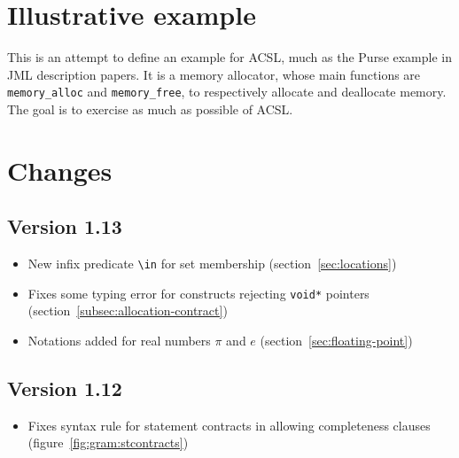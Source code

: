 \documentclass[web]{frama-c-book}
\begin{document}






\section{Illustrative example}
\label{sec:illustrative-example}
This is an attempt to define an example for ACSL, much as the Purse
example in JML description papers.  It is a memory allocator, whose
main functions are \lstinline|memory_alloc| and \lstinline|memory_free|, to
respectively allocate and deallocate memory.  The goal is to exercise
as much as possible of ACSL.

%

\section{Changes}

\subsection{Version 1.13} %
\begin{itemize}
\item New infix predicate \lstinline|\in| for set membership
  (section~\ref{sec:locations})
\item Fixes some typing error for constructs rejecting \lstinline|void*| pointers (section~\ref{subsec:allocation-contract})
\item Notations added for real numbers $\pi$ and $e$ (section~\ref{sec:floating-point})
\end{itemize}

\subsection{Version 1.12} %
\begin{itemize}
\item Fixes syntax rule for statement contracts in allowing completeness clauses
  (figure~\ref{fig:gram:stcontracts})
\end{itemize}
\end{document}
